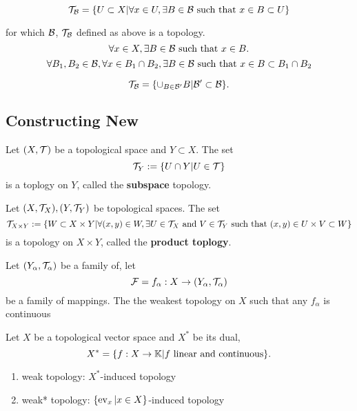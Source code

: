 \begin{equation*}
    \mathcal{T}_{\mathcal{B}}=\{U\subset X|\forall x\in U,\exists B\in\mathcal{B} \text{ such that } x\in B\subset U\}
\end{equation*}

for which $\mathcal{B}$, $\mathcal{T}_{\mathcal{B}}$ defined as above is a topology.
\begin{equation*}
    \forall x\in X,\exists B\in\mathcal{B}\text{ such that }x\in B.
\end{equation*}
\begin{equation*}
    \forall B_1,B_2\in\mathcal{B},\forall x\in B_1\cap B_2,\exists B\in\mathcal{B}\text{ such that }x\in B\subset B_1\cap B_2
\end{equation*}


\begin{theorem}
    \begin{equation*}
        \mathcal{T}_{\mathcal{B}}=\{\cup_{B\in\mathcal{B}'}B|\mathcal{B}'\subset \mathcal{B}\}.
    \end{equation*}
\end{theorem}


\subsection{Constructing New }

\begin{definition}
    Let $(X,\mathcal{T})$ be a topological space and $Y\subset X$.
    The set $$\mathcal{T}_Y:=\{U\cap Y|U\in\mathcal{T}\}$$ is a toplogy on $Y$, called the \textbf{subspace} topology.
\end{definition}

\begin{definition}
    Let $(X,\mathcal{T}_X),(Y,\mathcal{T}_Y)$ be topological spaces. The set
    $$\mathcal{T}_{X\times Y}:=\{W\subset X\times Y|\forall (x,y)\in W,\exists U\in\mathcal{T}_X\text{ and }V\in\mathcal{T}_Y\text{ such that }(x,y)\in U\times V\subset W\}$$
    is a topology on $X\times Y$, called the \textbf{product toplogy}.
\end{definition}

\begin{definition}
    Let $(Y_\alpha,\mathcal{T}_\alpha)$ be a family of,
    let 
    $$
    \mathcal{F}={f_\alpha:X\to (Y_\alpha,\mathcal{T}_\alpha)}
    $$
    be a family of mappings.
    The the weakest topology on $X$ such that any $f_\alpha$ is continuous
\end{definition}

\begin{example}
    Let $X$ be a topological vector space and $X^*$ be its dual,
    $$X^*=\{f:X\to\mathbb{K}|f\text{ linear and continuous}\}.$$
    \begin{enumerate}[label=(\roman*)]
        \item weak topology: $X^*$-induced topology
        \item weak* topology: $\{\operatorname{ev}_x|x\in X\}$-induced topology
    \end{enumerate}
\end{example}




